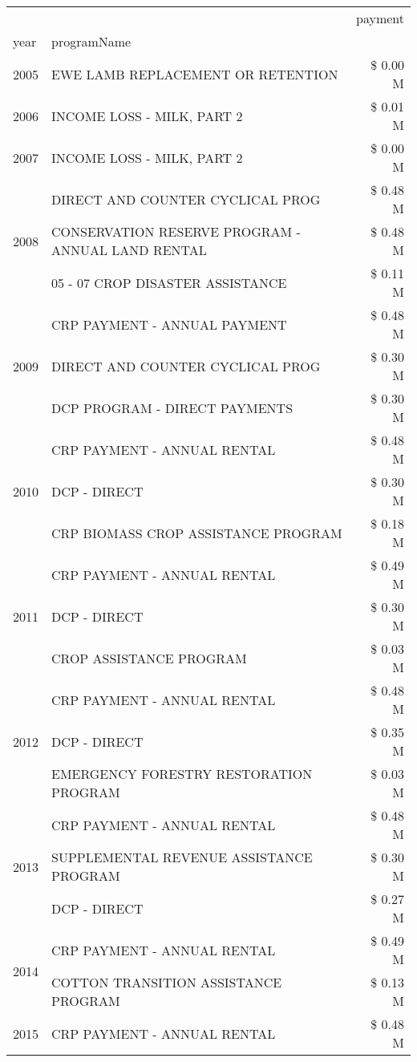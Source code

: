 \begin{tabular}{llr}
\toprule
 &  & payment \\
year & programName &  \\
\midrule
2005 & EWE LAMB REPLACEMENT OR RETENTION & \$ 0.00 M \\
\cline{1-3}
2006 & INCOME LOSS - MILK, PART 2 & \$ 0.01 M \\
\cline{1-3}
2007 & INCOME LOSS - MILK, PART 2 & \$ 0.00 M \\
\cline{1-3}
\multirow[t]{3}{*}{2008} & DIRECT AND COUNTER CYCLICAL PROG & \$ 0.48 M \\
 & CONSERVATION RESERVE PROGRAM - ANNUAL LAND RENTAL & \$ 0.48 M \\
 & 05 - 07 CROP DISASTER ASSISTANCE & \$ 0.11 M \\
\cline{1-3}
\multirow[t]{3}{*}{2009} & CRP PAYMENT - ANNUAL PAYMENT & \$ 0.48 M \\
 & DIRECT AND COUNTER CYCLICAL PROG & \$ 0.30 M \\
 & DCP PROGRAM - DIRECT PAYMENTS & \$ 0.30 M \\
\cline{1-3}
\multirow[t]{3}{*}{2010} & CRP PAYMENT - ANNUAL RENTAL & \$ 0.48 M \\
 & DCP - DIRECT & \$ 0.30 M \\
 & CRP BIOMASS CROP ASSISTANCE PROGRAM & \$ 0.18 M \\
\cline{1-3}
\multirow[t]{3}{*}{2011} & CRP PAYMENT - ANNUAL RENTAL & \$ 0.49 M \\
 & DCP - DIRECT & \$ 0.30 M \\
 & CROP ASSISTANCE PROGRAM & \$ 0.03 M \\
\cline{1-3}
\multirow[t]{3}{*}{2012} & CRP PAYMENT - ANNUAL RENTAL & \$ 0.48 M \\
 & DCP - DIRECT & \$ 0.35 M \\
 & EMERGENCY FORESTRY RESTORATION PROGRAM & \$ 0.03 M \\
\cline{1-3}
\multirow[t]{3}{*}{2013} & CRP PAYMENT - ANNUAL RENTAL & \$ 0.48 M \\
 & SUPPLEMENTAL REVENUE ASSISTANCE PROGRAM & \$ 0.30 M \\
 & DCP - DIRECT & \$ 0.27 M \\
\cline{1-3}
\multirow[t]{2}{*}{2014} & CRP PAYMENT - ANNUAL RENTAL & \$ 0.49 M \\
 & COTTON TRANSITION ASSISTANCE PROGRAM & \$ 0.13 M \\
\cline{1-3}
\multirow[t]{2}{*}{2015} & CRP PAYMENT - ANNUAL RENTAL & \$ 0.48 M \\

\end{tabular}
